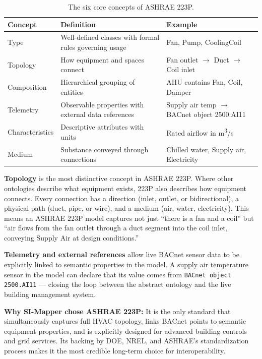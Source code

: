 \begin{table}[htbp]
\centering
\caption{The six core concepts of ASHRAE 223P.}
\label{tab:223p-concepts}
\small
\begin{tabular}{lp{5.5cm}p{5cm}}
\toprule
\textbf{Concept} & \textbf{Definition} & \textbf{Example} \\
\midrule
Type & Well-defined classes with formal rules governing usage & Fan, Pump, CoolingCoil \\
Topology & How equipment and spaces connect & Fan outlet $\to$ Duct $\to$ Coil inlet \\
Composition & Hierarchical grouping of entities & AHU contains Fan, Coil, Damper \\
Telemetry & Observable properties with external data references & Supply air temp $\to$ BACnet object 2500.AI11 \\
Characteristics & Descriptive attributes with units & Rated airflow in m\textsuperscript{3}/s \\
Medium & Substance conveyed through connections & Chilled water, Supply air, Electricity \\
\bottomrule
\end{tabular}
\end{table}

\textbf{Topology} is the most distinctive concept in ASHRAE 223P.
Where other ontologies describe what equipment exists, 223P also describes how equipment connects.
Every connection has a direction (inlet, outlet, or bidirectional), a physical path (duct, pipe, or
wire), and a medium (air, water, electricity).
This means an ASHRAE 223P model captures not just ``there is a fan and a coil'' but ``air flows from
the fan outlet through a duct segment into the coil inlet, conveying Supply Air at design conditions.''

\textbf{Telemetry and external references} allow live BACnet sensor data to be explicitly linked to
semantic properties in the model.
A supply air temperature sensor in the model can declare that its value comes from
\texttt{BACnet object 2500.AI11} --- closing the loop between the abstract ontology and the live
building management system.

\textbf{Why SI-Mapper chose ASHRAE 223P:} It is the only standard that simultaneously captures full
HVAC topology, links BACnet points to semantic equipment properties, and is explicitly designed for
advanced building controls and grid services.
Its backing by DOE, NREL, and ASHRAE's standardization process makes it the most credible long-term
choice for interoperability.


